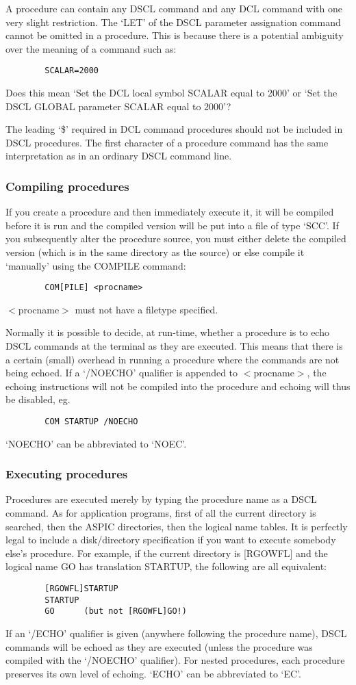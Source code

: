 A procedure can contain any DSCL command and any DCL command with one very
slight restriction.
The `LET' of the DSCL parameter assignation command cannot be omitted in a
procedure.
This is because there is a potential ambiguity over the meaning of a command
such as:
\begin{verbatim}
        SCALAR=2000
\end{verbatim}
Does this mean `Set the DCL local symbol SCALAR equal to 2000' or `Set the DSCL
GLOBAL parameter SCALAR equal to 2000'?

The leading `\$' required in DCL command procedures should not be included in
DSCL procedures.
The first character of a procedure command has the same interpretation as in an
ordinary DSCL command line.
\subsubsection {Compiling procedures}
If you create a procedure and then immediately execute it, it will be compiled
before it is run and the compiled version will be put into a file of type `SCC'.
If you subsequently alter the procedure source, you must either delete the
compiled version (which is in the same directory as the source) or else compile
it `manually' using the COMPILE command:
\begin{verbatim}
        COM[PILE] <procname>
\end{verbatim}
$<$procname$>$ must not have a filetype specified.

Normally it is possible to decide, at run-time, whether a procedure is to echo
DSCL commands at the terminal as they are executed.
This means that there is a certain (small) overhead in running a procedure where
the commands are not being echoed.
If a `/NOECHO' qualifier is appended to $<$procname$>$, the echoing instructions
will not be compiled into the procedure and echoing will thus be disabled, eg.
\begin{verbatim}
        COM STARTUP /NOECHO
\end{verbatim}
`NOECHO' can be abbreviated to `NOEC'.
\subsubsection {Executing procedures}
Procedures are executed merely by typing the procedure name as a DSCL command.
As for application programs, first of all the current directory is searched,
then the ASPIC directories, then the logical name tables.
It is perfectly legal to include a disk/directory specification if you want to
execute somebody else's procedure.
For example, if the current directory is [RGOWFL] and the logical name GO has
translation STARTUP, the following are all equivalent:
\begin{verbatim}
        [RGOWFL]STARTUP
        STARTUP
        GO      (but not [RGOWFL]GO!)
\end{verbatim}
If an `/ECHO' qualifier is given (anywhere following the procedure name), DSCL
commands will be echoed as they are executed (unless the procedure was compiled
with the `/NOECHO' qualifier).
For nested procedures, each procedure preserves its own level of echoing.
`ECHO' can be abbreviated to `EC'.

